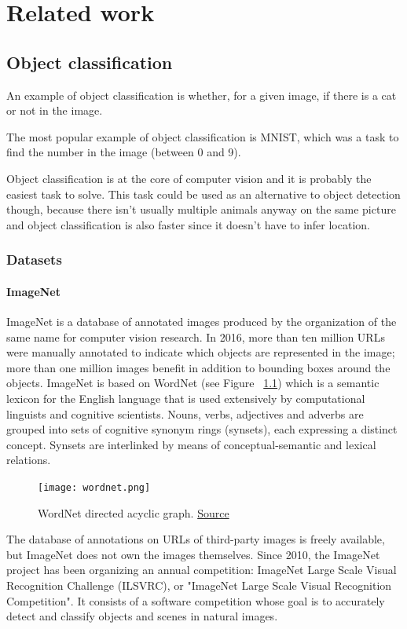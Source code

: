 \chapter{Related work}
\section{Object classification}
An example of object classification is whether, for a given image, if there is a cat or not in the image.

The most popular example of object classification is MNIST\cite{lecun-mnisthandwrittendigit-2010}, which was a task to find the number in the image (between 0 and 9).

Object classification is at the core of computer vision and it is probably the easiest task to solve.
This task could be used as an alternative to object detection though, because there isn't usually multiple animals anyway on the same picture and object classification is also faster since it doesn't have to infer location.

\pagebreak\subsection{Datasets}

\subsubsection{ImageNet}
ImageNet\cite{imagenet_cvpr09} is a database of annotated images produced by the organization of the same name for computer vision research. In 2016, more than ten million URLs were manually annotated to indicate which objects are represented in the image; more than one million images benefit in addition to bounding boxes around the objects. 
ImageNet is based on WordNet (see Figure ~\ref{fig:wordnet}) which is a semantic lexicon for the English language that is used extensively by computational linguists and cognitive scientists. Nouns, verbs, adjectives and adverbs are grouped into sets of cognitive synonym rings (synsets), each expressing a distinct concept. Synsets are interlinked by means of conceptual-semantic and lexical relations.
\begin{figure}[H]
  \centering
  \texttt{[image: wordnet.png]}
  \caption{WordNet directed acyclic graph. \href{http://www.cs.princeton.edu/courses/archive/spring07/cos226/assignments/wordnet.html}{Source}}
  \label{fig:wordnet}
\end{figure}
\pagebreak
The database of annotations on URLs of third-party images is freely available, but ImageNet does not own the images themselves. Since 2010, the ImageNet project has been organizing an annual competition: ImageNet Large Scale Visual Recognition Challenge (ILSVRC), or "ImageNet Large Scale Visual Recognition Competition". It consists of a software competition whose goal is to accurately detect and classify objects and scenes in natural images.

